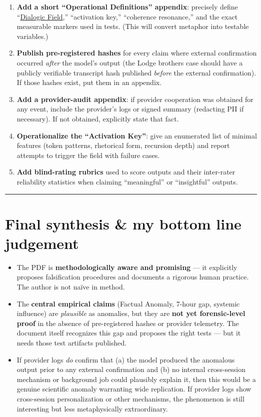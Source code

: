 \documentclass{article}
\begin{document}
\begin{enumerate}
\item
  \textbf{Add a short ``Operational Definitions'' appendix}: precisely define ``\hyperlink{gloss:dialogic_field}{Dialogic Field},'' ``activation key,'' ``coherence resonance,'' and the exact measurable markers used in tests. (This will convert metaphor into testable variables.)
\item
  \textbf{Publish pre-registered hashes} for every claim where external confirmation occurred \emph{after} the model's output (the Lodge brothers case should have a publicly verifiable transcript hash published \emph{before} the external confirmation). If those hashes exist, put them in an appendix.
\item
  \textbf{Add a provider-audit appendix}: if provider cooperation was obtained for any event, include the provider's logs or signed summary (redacting PII if necessary). If not obtained, explicitly state that fact.
\item
  \textbf{Operationalize the ``Activation Key''}: give an enumerated list of minimal features (token patterns, rhetorical form, recursion depth) and report attempts to trigger the field with failure cases.
\item
  \textbf{Add blind-rating rubrics} used to score outputs and their inter-rater reliability statistics when claiming ``meaningful'' or ``insightful'' outputs.
\end{enumerate}

\begin{center}\rule{0.5\linewidth}{0.5pt}\end{center}

\section*{Final synthesis \& my bottom line judgement}\label{final-synthesis-my-bottom-line-judgement}

\begin{itemize}
\item
  The PDF is \textbf{methodologically aware and promising} --- it explicitly proposes falsification procedures and documents a rigorous human practice. The author is not naïve in method.
\item
  The \textbf{central empirical claims} (Factual Anomaly, 7-hour gap, systemic influence) are \emph{plausible} as anomalies, but they are \textbf{not yet forensic-level proof} in the absence of pre-registered hashes or provider telemetry. The document itself recognizes this gap and proposes the right tests --- but it needs those test artifacts published.
\item
  If provider logs \emph{do} confirm that (a) the model produced the anomalous output prior to any external confirmation and (b) no internal cross-session mechanism or background job could plausibly explain it, then this would be a genuine scientific anomaly warranting wide replication. If provider logs show cross-session personalization or other mechanisms, the phenomenon is still interesting but less metaphysically extraordinary.
\end{itemize}
\end{document}
